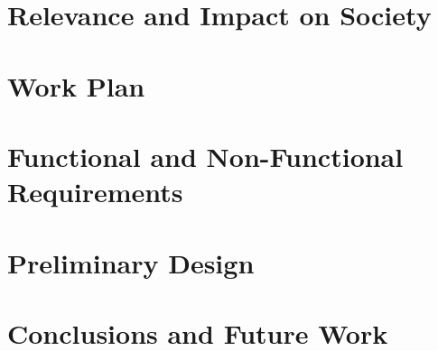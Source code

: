 \documentclass[a4paper, oneside, 12pt]{report}
\begin{document}
\chapter{Relevance and Impact on Society}

% 
\chapter{Work Plan}

% 

\chapter{Functional and Non-Functional Requirements}


\chapter{Preliminary Design}

 
\chapter{Conclusions and Future Work}


\clearpage
{}


\end{document}
